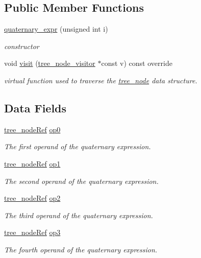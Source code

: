 \subsection*{Public Member Functions}
\begin{DoxyCompactItemize}
\item 
\hyperlink{structquaternary__expr_a9101147c96724696a0fdf02479fc9fdc}{quaternary\+\_\+expr} (unsigned int i)
\begin{DoxyCompactList}\small\item\em constructor \end{DoxyCompactList}\item 
void \hyperlink{structquaternary__expr_ad01a5f8cb89a8bc218aa66029faf2cde}{visit} (\hyperlink{classtree__node__visitor}{tree\+\_\+node\+\_\+visitor} $\ast$const v) const override
\begin{DoxyCompactList}\small\item\em virtual function used to traverse the \hyperlink{classtree__node}{tree\+\_\+node} data structure. \end{DoxyCompactList}\end{DoxyCompactItemize}
\subsection*{Data Fields}
\begin{DoxyCompactItemize}
\item 
\hyperlink{tree__node_8hpp_a6ee377554d1c4871ad66a337eaa67fd5}{tree\+\_\+node\+Ref} \hyperlink{structquaternary__expr_a81479ae8fd09563f3975ca92807aa97a}{op0}
\begin{DoxyCompactList}\small\item\em The first operand of the quaternary expression. \end{DoxyCompactList}\item 
\hyperlink{tree__node_8hpp_a6ee377554d1c4871ad66a337eaa67fd5}{tree\+\_\+node\+Ref} \hyperlink{structquaternary__expr_a10aa98ea0339bf515fb06eed6b104dbb}{op1}
\begin{DoxyCompactList}\small\item\em The second operand of the quaternary expression. \end{DoxyCompactList}\item 
\hyperlink{tree__node_8hpp_a6ee377554d1c4871ad66a337eaa67fd5}{tree\+\_\+node\+Ref} \hyperlink{structquaternary__expr_abcc2e94e3c0589b52407b01ca54f1d1f}{op2}
\begin{DoxyCompactList}\small\item\em The third operand of the quaternary expression. \end{DoxyCompactList}\item 
\hyperlink{tree__node_8hpp_a6ee377554d1c4871ad66a337eaa67fd5}{tree\+\_\+node\+Ref} \hyperlink{structquaternary__expr_ae4aff421c78657dc000c1afbf150e2c2}{op3}
\begin{DoxyCompactList}\small\item\em The fourth operand of the quaternary expression. \end{DoxyCompactList}\end{DoxyCompactItemize}
